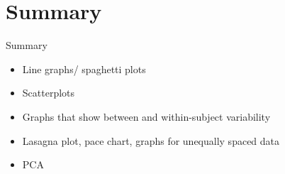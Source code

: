 \documentclass[
  9pt,
  ignorenonframetext,
]{beamer}
\providecommand{\tightlist}{%
  \setlength{\itemsep}{0pt}\setlength{\parskip}{0pt}}
\begin{document}
\hypertarget{summary}{%
\section{Summary}\label{summary}}

\begin{frame}{Summary}
\protect\hypertarget{summary-1}{}
\begin{itemize}
\tightlist
\item
  Line graphs/ spaghetti plots
\item
  Scatterplots
\item
  Graphs that show between and within-subject variability
\item
  Lasagna plot, pace chart, graphs for unequally spaced data
\item
  PCA
\end{itemize}
\end{frame}
\end{document}
